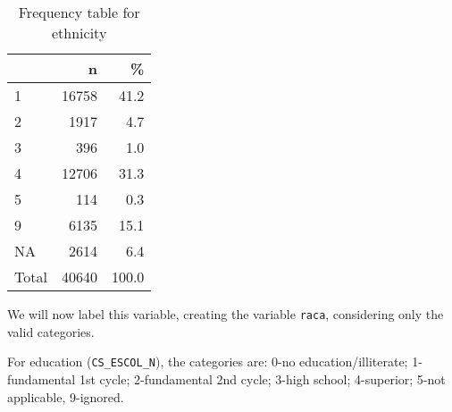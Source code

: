 \documentclass[
]{article}
\newenvironment{Shaded}{\begin{snugshade}}{\end{snugshade}}
\newcommand{\CommentTok}[1]{\textcolor[rgb]{0.56,0.35,0.01}{\textit{#1}}}
\newcommand{\DataTypeTok}[1]{\textcolor[rgb]{0.13,0.29,0.53}{#1}}
\newcommand{\DecValTok}[1]{\textcolor[rgb]{0.00,0.00,0.81}{#1}}
\newcommand{\KeywordTok}[1]{\textcolor[rgb]{0.13,0.29,0.53}{\textbf{#1}}}
\newcommand{\NormalTok}[1]{#1}
\newcommand{\OperatorTok}[1]{\textcolor[rgb]{0.81,0.36,0.00}{\textbf{#1}}}
\newcommand{\OtherTok}[1]{\textcolor[rgb]{0.56,0.35,0.01}{#1}}
\newcommand{\StringTok}[1]{\textcolor[rgb]{0.31,0.60,0.02}{#1}}
\begin{document}
\begin{table}[!h]

\caption{\label{tab:unnamed-chunk-18}Frequency table for ethnicity}
\centering
\begin{tabular}[t]{l|r|r}
\hline
  & n & \%\\
\hline
1 & 16758 & 41.2\\
\hline
2 & 1917 & 4.7\\
\hline
3 & 396 & 1.0\\
\hline
4 & 12706 & 31.3\\
\hline
5 & 114 & 0.3\\
\hline
9 & 6135 & 15.1\\
\hline
NA & 2614 & 6.4\\
\hline
Total & 40640 & 100.0\\
\hline
\end{tabular}
\end{table}

We will now label this variable, creating the variable \texttt{raca},
considering only the valid categories.

\begin{Shaded}
\end{Shaded}

For education (\texttt{CS\_ESCOL\_N}), the categories are: 0-no
education/illiterate; 1-fundamental 1st cycle; 2-fundamental 2nd cycle;
3-high school; 4-superior; 5-not applicable, 9-ignored.

\begin{Shaded}
\end{Shaded}
\end{document}

